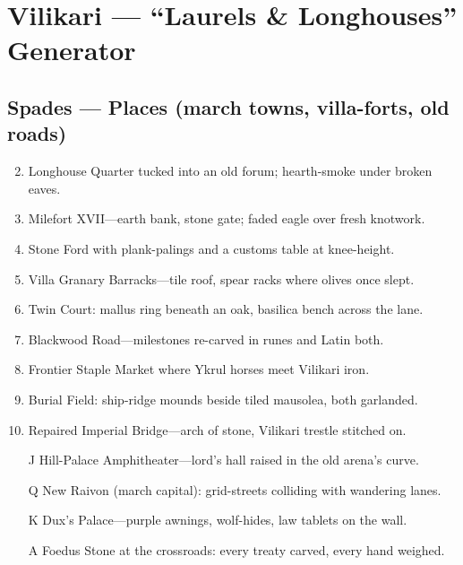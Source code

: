 \chapter{Vilikari --- ``Laurels \& Longhouses'' Generator}
\label{chap:vilikari}

\section*{Spades --- Places (march towns, villa-forts, old roads)}
\label{sec:vilikari-places}
\begin{enumerate}
\setcounter{enumi}{1}
\item Longhouse Quarter tucked into an old forum; hearth-smoke under broken eaves.
\item Milefort XVII---earth bank, stone gate; faded eagle over fresh knotwork.
\item Stone Ford with plank-palings and a customs table at knee-height.
\item Villa Granary Barracks---tile roof, spear racks where olives once slept.
\item Twin Court: mallus ring beneath an oak, basilica bench across the lane.
\item Blackwood Road---milestones re-carved in runes and Latin both.
\item Frontier Staple Market where Ykrul horses meet Vilikari iron.
\item Burial Field: ship-ridge mounds beside tiled mausolea, both garlanded.
\item Repaired Imperial Bridge---arch of stone, Vilikari trestle stitched on.
\item[J] Hill-Palace Amphitheater---lord's hall raised in the old arena's curve.
\item[Q] New Raivon (march capital): grid-streets colliding with wandering lanes.
\item[K] Dux's Palace---purple awnings, wolf-hides, law tablets on the wall.
\item[A] Foedus Stone at the crossroads: every treaty carved, every hand weighed.
\end{enumerate}


